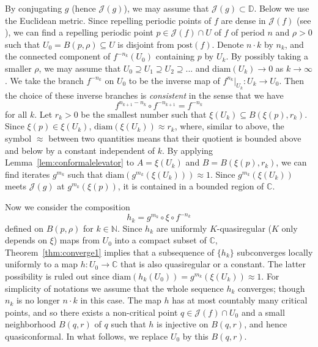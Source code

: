 \documentclass[12pt]{amsart}
\makeatletter
\newtheorem*{pf}{Proof}
\newcommand{\C}{\mathbb{C}}
\newcommand{\D}{\mathbb{D}}
\newcommand{\N}{\mathbb{N}}
\newcommand{\sub}{\subseteq }
\newcommand{\J}{\mathcal{J}}
\newcommand{\co}{\colon}
\renewenvironment{pf}[1][\proofname]{%
  \par
  \pushQED{\qed}%
  \normalfont\topsep6\p@ \@plus6\p@ \trivlist
  \item[\hskip\labelsep\itshape
        \bfseries #1\@addpunct{:}]%
  \ignorespaces
}{%
  \popQED\endtrivlist
}
\makeatother
\begin{document}
\begin{pf}
  By conjugating $g$ (hence $\J(g)$), we may assume that $\J(g)\subset \D$. Below we use the Euclidean metric.
  Since repelling periodic points of $f$ are dense in $\J(f)$ (see
 \cite[p.~148, Theorem~6.9.2]{Be}), we can find a repelling periodic point 
$p\in \J(f)\cap U$ of $f$ of period $n$ and $\rho>0$ such that $U_0=B(p, \rho)\sub U$  is disjoint from $\mathrm{post}(f)$.  
 Denote $n\cdot k$ by $n_k$, and the connected component of $f^{-n_k}(U_0)$ containing $p$ by $U_k$. 
 By possibly taking a smaller $\rho$, we may assume that $U_0\supseteq  U_1\supseteq  U_2\supseteq ...$ and $\mathrm{diam}(U_k)\to 0$ as $k\to\infty$. 
 We take the branch $f^{-n_k}$ on $U_0$ to be the inverse map of 
 $f^{n_k}|_{U_k}\co U_k\to U_0$. Then the choice of these inverse branches is {\em consistent} in the sense that we have 
 \begin{equation}\label{eqn:consistent}
 f^{n_{k+1}-n_k}\circ f^{-n_{k+1}}=f^{-n_k}
 \end{equation}
 for all $k$. 
 Let $r_k>0$ be the smallest number such that $\xi(U_k)\sub B(\xi(p),r_k)$. Since $\xi(p)\in \xi(U_k)$, $\mathrm{diam}(\xi(U_k))\approx r_k$, where, similar to above,  the symbol $\approx$ between two quantities means that their quotient is bounded above and below by a constant independent of $k$. 
By applying Lemma~\ref{lem:conformalelevator} to $A=\xi(U_k)$ and $B=B(\xi(p),r_k)$, we can find iterates
$g^{m_k}$ such that $\mathrm{diam}\left(g^{m_k}(\xi(U_k))\right)\approx 1$. Since $g^{m_k}(\xi(U_k))$ meets $\J(g)$ at $g^{m_k}(\xi(p))$, it is contained in a 
bounded region of $\C$.


Now we consider the composition 
$$
h_k=g^{m_k}\circ \xi\circ f^{-n_k}
$$ 
defined on $B(p,\rho)$ for $k\in \N$. 
Since $h_k$ are uniformly $K$-quasiregular ($K$ only depends on $\xi$) maps from $U_0$ into a compact subset of $\C$,  
Theorem~\ref{thm:converge1} implies that a subsequence of $\{h_k\}$
subconverges locally uniformly to a map $h\co U_0\to \C$  that 
is also quasiregular or a constant. The latter possibility is ruled out since 
$\mathrm{diam}\left(h_k(U_0)\right)=g^{m_k}(\xi(U_k))\approx 1$. For simplicity of notations we assume that the whole sequence $h_k$ converges; though $n_k$ is no longer $n\cdot k$ in this case. The map
$h$ has at most countably many critical points, and so there exists a non-critical point $q\in \J(f)\cap U_0$ and a small neighborhood $B(q,r)$ of $q$ such that $h$ is injective on $B(q,r)$, and hence quasiconformal. 
In what follows, we replace $U_0$ by this $B(q,r)$.



\end{pf}
\end{document}
